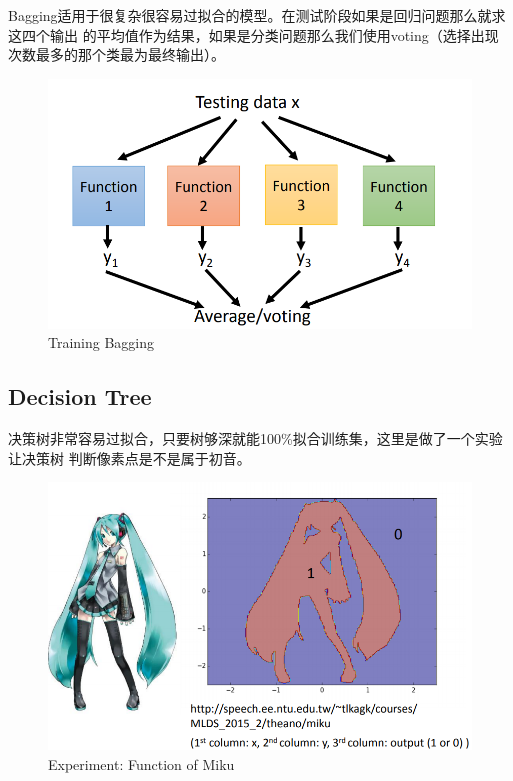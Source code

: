 Bagging适用于很复杂很容易过拟合的模型。在测试阶段如果是回归问题那么就求这四个输出
的平均值作为结果，如果是分类问题那么我们使用voting（选择出现次数最多的那个类最为最终输出）。
\begin{figure}[H]
    \centerline{\includegraphics[scale=0.3]{Part1/Chapter/images/bagging2.png}}
    \caption{Training Bagging}
\end{figure}

\subsection{Decision Tree}
决策树非常容易过拟合，只要树够深就能100\%拟合训练集，这里是做了一个实验让决策树
判断像素点是不是属于初音。
\begin{figure}[H]
    \centerline{\includegraphics[scale=0.3]{Part1/Chapter/images/experiment-miku.png}}
    \caption{Experiment: Function of Miku}
\end{figure}

